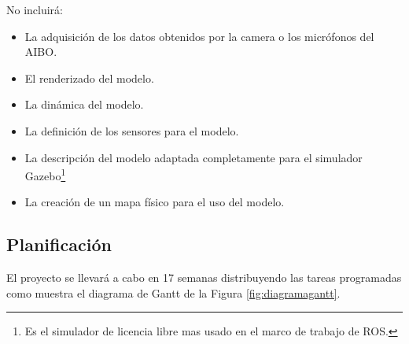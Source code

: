 \documentclass[12pt,a4paper,final,twoside]{book}
\begin{document}
No incluirá:
\begin{itemize}
\item La adquisición de los datos obtenidos por la camera o los micrófonos del AIBO.
\item El renderizado del modelo.
\item La dinámica del modelo.
\item La definición de los sensores para el modelo.
\item La descripción del modelo adaptada completamente para el simulador Gazebo\footnote{Es el simulador de licencia libre mas usado en el marco de trabajo de ROS.}
\item La creación de un mapa físico para el uso del modelo.
\end{itemize}


\subsection{Planificación}
El proyecto se llevará a cabo en 17 semanas  distribuyendo las tareas programadas como muestra el diagrama de Gantt de la Figura \ref{fig:diagramagantt}.
\end{document}
